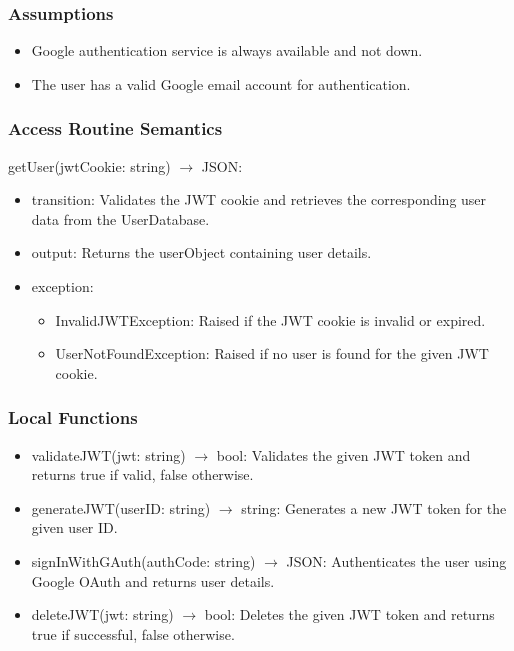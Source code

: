 \documentclass[12pt, titlepage]{article}
\begin{document}
\subsubsection{Assumptions}

\begin{itemize}
  \item Google authentication service is always available and not down.
  \item The user has a valid Google email account for authentication.
\end{itemize}

\subsubsection{Access Routine Semantics}

\noindent getUser(jwtCookie: string) $\rightarrow$ JSON:
\begin{itemize}
\item transition: Validates the JWT cookie and retrieves the corresponding user data from the UserDatabase.
\item output: Returns the userObject containing user details.
\item exception: 
  \begin{itemize}
    \item InvalidJWTException: Raised if the JWT cookie is invalid or expired.
    \item UserNotFoundException: Raised if no user is found for the given JWT cookie.
  \end{itemize}
\end{itemize}


\subsubsection{Local Functions}

\begin{itemize}
  \item validateJWT(jwt: string) $\rightarrow$ bool: Validates the given JWT token and returns true if valid, false otherwise.
  \item generateJWT(userID: string) $\rightarrow$ string: Generates a new JWT token for the given user ID.
  \item signInWithGAuth(authCode: string) $\rightarrow$ JSON: Authenticates the user using Google OAuth and returns user details.
  \item deleteJWT(jwt: string) $\rightarrow$ bool: Deletes the given JWT token and returns true if successful, false otherwise.
\end{itemize}
\end{document}
